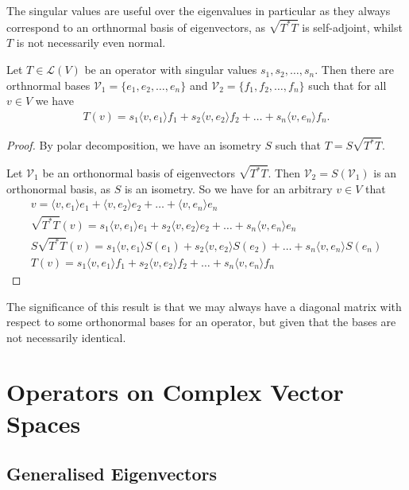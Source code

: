 \documentclass[]{article}
\begin{document}
The singular values are useful over the eigenvalues in particular as they always correspond to an orthnormal basis of eigenvectors, as $\sqrt{T^*T}$ is self-adjoint, whilst $T$ is not necessarily even normal.

\begin{thm} 
		Let $T \in \mathcal{L}(V)$ be an operator with singular values $s_1,s_2,\ldots,s_n$. Then there are orthnormal bases $\mathcal{V}_1 = \{e_1,e_2,\ldots,e_n\}$ and $\mathcal{V}_2 = \{f_1,f_2,\ldots,f_n\}$ such that for all $v \in V$ we have 
		\begin{align*}
				T(v) = s_1 \langle v, e_1 \rangle f_1 + s_2 \langle v, e_2 \rangle f_2 + \ldots + s_n \langle v, e_n \rangle f_n.
		\end{align*}
\end{thm}

\begin{proof}
		By polar decomposition, we have an isometry $S$ such that $T = S \sqrt{T^*T}$.

		Let $\mathcal{V}_1$ be an orthonormal basis of eigenvectors $\sqrt{T^*T}$. Then $\mathcal{V}_2 = S(\mathcal{V}_1)$ is an orthonormal basis, as $S$ is an isometry. So we have for an arbitrary $v \in V$ that
		\begin{align*}
				v = \langle v, e_1 \rangle e_1 + \langle v, e_2 \rangle e_2 + \ldots + \langle v, e_n \rangle e_n \\
				\sqrt{T^*T}(v) = s_1 \langle v, e_1 \rangle e_1 + s_2 \langle v, e_2 \rangle e_2 + \ldots + s_n \langle v, e_n \rangle e_n \\
				S\sqrt{T^*T}(v) = s_1 \langle v, e_1 \rangle S(e_1) + s_2 \langle v, e_2 \rangle S(e_2) + \ldots + s_n \langle v, e_n \rangle S(e_n) \\
				T(v) = s_1 \langle v, e_1 \rangle f_1 + s_2 \langle v, e_2 \rangle f_2 + \ldots + s_n \langle v, e_n \rangle f_n
		\end{align*}
\end{proof}

The significance of this result is that we may always have a diagonal matrix with respect to some orthonormal bases for an operator, but given that the bases are not necessarily identical.

\section{Operators on Complex Vector Spaces}

\subsection{Generalised Eigenvectors}
\end{document}
